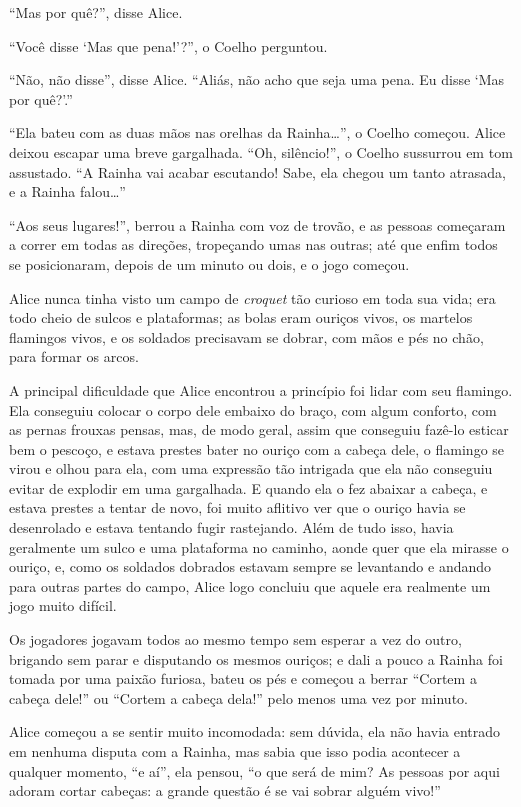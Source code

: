 ``Mas por quê?'', disse Alice.

``Você disse `Mas que pena!'?'', o Coelho perguntou.

``Não, não disse'', disse Alice. ``Aliás, não acho que seja uma pena. Eu
disse `Mas por quê?'.''

``Ela bateu com as duas mãos nas orelhas da Rainha\ldots{}'', o Coelho
começou. Alice deixou escapar uma breve gargalhada. ``Oh, silêncio!'', o
Coelho sussurrou em tom assustado. ``A Rainha vai acabar escutando!
Sabe, ela chegou um tanto atrasada, e a Rainha falou\ldots{}''

``Aos seus lugares!'', berrou a Rainha com voz de trovão, e as pessoas
começaram a correr em todas as direções, tropeçando umas nas outras; até
que enfim todos se posicionaram, depois de um minuto ou dois, e o jogo
começou.

Alice nunca tinha visto um campo de \textit{croquet} tão curioso em toda sua
vida; era todo cheio de sulcos e plataformas; as bolas eram ouriços
vivos, os martelos flamingos vivos, e os soldados precisavam se dobrar,
com mãos e pés no chão, para formar os arcos.

A principal dificuldade que Alice encontrou a princípio foi lidar com
seu flamingo. Ela conseguiu colocar o corpo dele embaixo do braço, com algum
conforto, com as pernas frouxas pensas, mas, de modo geral, assim que
conseguiu fazê-lo esticar bem o pescoço, e estava prestes bater no
ouriço com a cabeça dele, o flamingo se virou e olhou para ela, com uma
expressão tão intrigada que ela não conseguiu evitar de explodir em uma
gargalhada. E quando ela o fez abaixar a cabeça, e estava prestes a
tentar de novo, foi muito aflitivo ver que o ouriço havia se desenrolado
e estava tentando fugir rastejando. Além de tudo isso, havia geralmente
um sulco e uma plataforma no caminho, aonde quer que ela mirasse o
ouriço, e, como os soldados dobrados estavam sempre se levantando e
andando para outras partes do campo, Alice logo concluiu que aquele era
realmente um jogo muito difícil.

Os jogadores jogavam todos ao mesmo tempo sem esperar a vez do outro,
brigando sem parar e disputando os mesmos ouriços; e dali a pouco a
Rainha foi tomada por uma paixão furiosa, bateu os pés e começou a
berrar ``Cortem a cabeça dele!'' ou ``Cortem a cabeça dela!'' pelo menos
uma vez por minuto.

Alice começou a se sentir muito incomodada: sem dúvida, ela não havia
entrado em nenhuma disputa com a Rainha, mas sabia que isso podia
acontecer a qualquer momento, ``e aí'', ela pensou, ``o que será de mim?
As pessoas por aqui adoram cortar cabeças: a grande questão é se vai
sobrar alguém vivo!''

